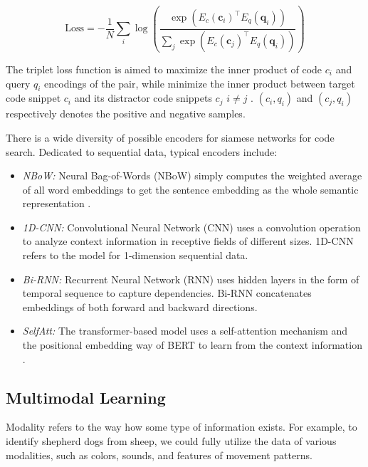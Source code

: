 \documentclass[conference]{IEEEtran}
\begin{document}
\begin{equation}\mathrm{Loss}=-\frac{1}{N} \sum_{i} \log \left(\frac{\exp \left(E_{c}\left(\mathbf{c}_{i}\right)^{\top} E_{q}\left(\mathbf{q}_{i}\right)\right)}{\sum_{j} \exp \left(E_{c}\left(\mathbf{c}_{j}\right)^{\top} E_{q}\left(\mathbf{q}_{i}\right)\right)}\right)\end{equation}

The triplet loss function is aimed to maximize the inner product of code $c_i$ and query $q_i$ encodings of the pair, while minimize the inner product between target code snippet $c_i$ and its distractor code snippets $c_j$ ${i}\neq{j}$ \cite{Husain2019CodeSearchNetCE}. $(c_i, q_i)$ and $(c_j, q_i)$ respectively denotes the positive and negative samples.

There is a wide diversity of possible encoders for siamese networks for code search. Dedicated to sequential data, typical encoders include:
\begin{itemize}
  \item \emph{NBoW:} Neural Bag-of-Words (NBoW) simply computes the weighted average of all word embeddings to get the sentence embedding as the whole semantic representation \cite{Kalchbrenner2014ACN,Iyyer2015DeepUC}.
\item \emph{1D-CNN:} Convolutional Neural Network (CNN) \cite{Kim2014ConvolutionalNN} uses a convolution operation to analyze context information in receptive fields of different sizes. 1D-CNN refers to the model for 1-dimension sequential data.
  \item \emph{Bi-RNN:} Recurrent Neural Network (RNN) \cite{Elman1990FindingSI} uses hidden layers in the form of temporal sequence to capture dependencies. Bi-RNN concatenates embeddings of both forward and backward directions. \item \emph{SelfAtt:} The transformer-based model uses a self-attention mechanism and the positional embedding way of BERT to learn from the context information \cite{Vaswani2017AttentionIA,Devlin2019BERTPO}.
\end{itemize}

\subsection{Multimodal Learning}

Modality refers to the way how some type of information exists. For example, to identify shepherd dogs from sheep, we could fully utilize the data of various modalities, such as colors, sounds, and features of movement patterns.
\end{document}
